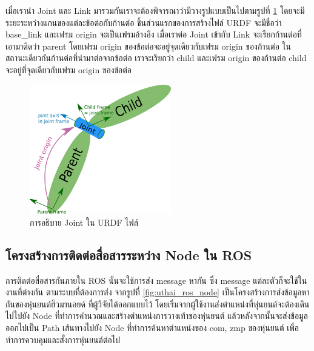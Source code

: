 เมื่อเรานำ Joint และ Link มารวมกันเราจะต้องพิจารณาว่ามีวางรูปแบบเป็นไปตามรูปที่ \ref{fig:urdf_joint}
โดยจะมีระยะระหว่างแกนของแต่ละข้อต่อกับก้านต่อ ชิ้นส่วนแรกของการสร้างไฟล์ URDF จะมีชื่อว่า base\_link
และเฟรม origin จะเป็นเฟรมอ้างอิง เมื่อเราต่อ Joint เข้ากับ Link จะเรียกก้านต่อที่เอามาติดว่า parent
โดยเฟรม origin ของข้อต่อจะอยู่จุดเดียวกับเฟรม origin ของก้านต่อ ในสถานะเดียวกันก้านต่อที่นำมาต่อจากข้อต่อ
เราจะเรียกว่า child และเฟรม origin ของก้านต่อ child จะอยู่ที่จุดเดียวกับเฟรม origin ของข้อต่อ

\begin{figure}[!ht]
	\centering
	\includegraphics[width=0.55\textwidth]{chapter3/images/urdf_joint.png}
	\caption{การอธิบาย Joint ใน URDF ไฟล์}
	\label{fig:urdf_joint}
\end{figure}



\clearpage
\subsection{โครงสร้างการติดต่อสื่อสารระหว่าง Node ใน ROS}
การติดต่อสื่อสารกันภายใน ROS นั้นจะใช้การส่ง message หากัน ซึ่ง message แต่ละตัวก็จะใช้ในงานที่ต่างกัน
ตามระบบที่ต้องการส่ง จากรูปที่ \ref{fig:uthai_ros_node} เป็นโครงสร้างการส่งข้อมูลหากันของหุ่นยนต์ฮิวมานอยด์
ที่ผู้วิจัยได้ออกแบบไว้ โดยเริ่มจากผู้ใช้งานส่งตำแหน่งที่หุ่นยนต์จะต้องเดินไปไปยัง Node ที่ทำการคำนวณและสร้างตำแหน่งการวางเท้าของหุ่นยนต์
แล้วหลังจากนั้นจะส่งข้อมูลออกไปเป็น Path เส้นทางไปยัง Node ที่ทำการค้นหาตำแหน่งของ com, zmp ของหุ่นยนต์
เพื่อทำการควบคุมและสั่งการหุ่นยนต์ต่อไป

